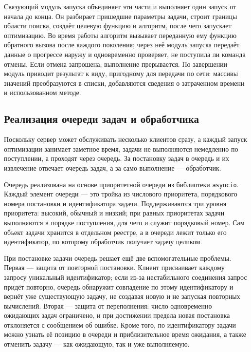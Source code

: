 \documentclass[14pt, a4paper]{extarticle}
\begin{document}
Связующий модуль запуска объединяет эти части и выполняет один запуск от начала до
конца. Он разбирает пришедшие параметры задачи, строит границы области поиска,
создаёт целевую функцию и алгоритм, после чего запускает оптимизацию. Во время
работы алгоритм вызывает переданную ему функцию обратного вызова после каждого
поколения; через неё модуль запуска передаёт данные о прогрессе наружу и
одновременно проверяет, не поступила ли команда отмены. Если отмена запрошена,
выполнение прерывается. По завершении модуль приводит результат к виду, пригодному
для передачи по сети: массивы значений преобразуются в списки, добавляются
сведения о затраченном времени и использованном методе.

\subsection{Реализация очереди задач и обработчика}
\label{subsec:queue}

Поскольку сервер может обслуживать несколько клиентов сразу, а каждый запуск
оптимизации занимает заметное время, задачи не выполняются немедленно по
поступлении, а проходят через очередь. За постановку задач в очередь и их
извлечение отвечает очередь задач, а за само выполнение --- обработчик.

Очередь реализована на основе приоритетной очереди из библиотеки \texttt{asyncio}.
Каждый элемент очереди --- это тройка из числового приоритета, порядкового номера
постановки и идентификатора задачи. Поддерживаются три уровня приоритета: высокий,
обычный и низкий; при равных приоритетах задачи выполняются в порядке поступления,
для чего и служит порядковый номер. Сам объект задачи хранится в отдельном
реестре, а в очереди лежит только его идентификатор, по которому обработчик
получает задачу целиком.

При постановке задачи очередь решает ещё две вспомогательные проблемы. Первая ---
защита от повторной постановки. Клиент присваивает каждому запросу уникальный
идентификатор; если из-за нестабильного соединения запрос придёт повторно, очередь
обнаружит совпадение по этому идентификатору и вернёт уже существующую задачу,
не создавая новую и не запуская повторных вычислений. Вторая --- защита от
переполнения: число одновременно ожидающих задач ограничено, и при достижении
предела новая постановка отклоняется с сообщением об ошибке. Кроме того, по
идентификатору задачи можно узнать её позицию в очереди и приблизительное время
ожидания, а также отменить задачу --- как ожидающую, так и уже выполняемую.
\end{document}
